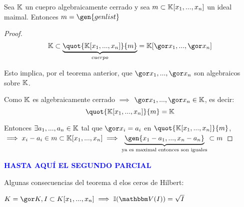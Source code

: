\begin{theorem}
	Sea $\mathbb{K}$ un cuepro algebraicamente cerrado y sea $m \subset \mathbb{K}[x_1,...,x_n]$ un ideal maimal. Entonces $m=\gen{genlist}$
\end{theorem}

\begin{proof}
 $$ \K \subset \underbrace{\quot{\K[x_1,...,x_n]}{m}}_{cuerpo} = \K[\cls{x_1},...,\cls{x_n}]$$
 
 Esto implica, por el teorema anterior, que $\cls{x_1},...,\cls{x_n}$ son algebraicos sobre $\mathbb{K}$.
 
 Como $\mathbb{K}$ es algebraicamente cerrado $\implies$ $\cls{x_1},...,\cls{x_n} \in \K$, es decir:
 $$ \quot{\K[x_1,...,x_n]}{m}= \K $$
 
 Entonces $\exists a_1,...,a_n \in \mathbb{K}$ tal que $\cls{x_i}=a_i$ en $\quot{\K[x_1,...,x_n]}{m}$, $\implies x_i-a_i \in m\subset \K[x_1,...,x_n] \implies \underbrace{\gen{x_1-a_1,...,x_n-a_n}}_{\text{ya es maximal entonces son iguales}} \subset m$
\end{proof}

\textcolor{blue}{\textbf{HASTA AQUÍ EL SEGUNDO PARCIAL}}

Algunas consecuencias del teorema d elos ceros de Hilbert:

$K=\cls{K}, I\subset K[x_1,...,x_n] \implies \I(\V(I))=\sqrt{I}$

